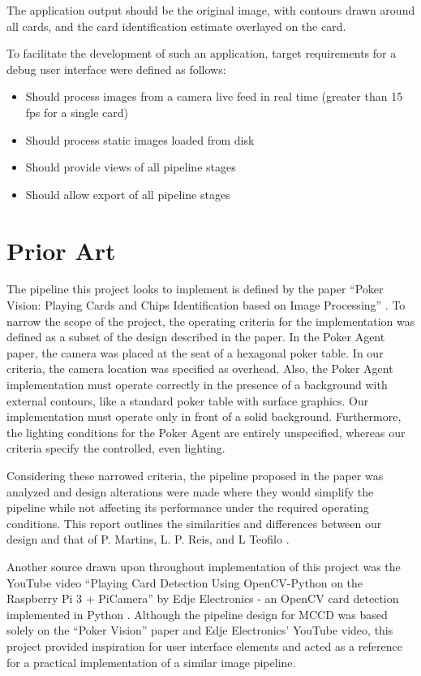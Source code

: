 \documentclass[conference]{IEEEtran}
\begin{document}
The application output should be the original image, with contours drawn around all cards, and the
card identification estimate overlayed on the card.

To facilitate the development of such an application, target requirements for a debug user interface
were defined as follows:
\begin{itemize}
    \item Should process images from a camera live feed in real time (greater than 15 fps for a
        single card)
    \item Should process static images loaded from disk
    \item Should provide views of all pipeline stages
    \item Should allow export of all pipeline stages
\end{itemize}

\section{Prior Art}
The pipeline this project looks to implement is defined by the paper ``Poker Vision: Playing Cards
and Chips Identification based on Image Processing'' \cite{poker-vision}. To narrow the scope of the
project, the operating criteria for the implementation was defined as a subset of the design
described in the paper. In the Poker Agent paper, the camera was placed at the seat of a hexagonal
poker table. In our criteria, the camera location was specified as overhead. Also, the Poker Agent
implementation must operate correctly in the presence of a background with external contours, like a
standard poker table with surface graphics. Our implementation must operate only in front of a solid
background. Furthermore, the lighting conditions for the Poker Agent are entirely unspecified,
whereas our criteria specify the controlled, even lighting.

Considering these narrowed criteria, the pipeline proposed in the paper was analyzed and design
alterations were made where they would simplify the pipeline while not affecting its performance
under the required operating conditions. This report outlines the similarities and differences
between our design and that of P. Martins, L. P. Reis, and L Teofilo \cite{poker-vision}.

Another source drawn upon throughout implementation of this project was the YouTube video ``Playing
Card Detection Using OpenCV-Python on the Raspberry Pi 3 + PiCamera'' by Edje Electronics - an
OpenCV card detection implemented in Python \cite{opencv-card-detection}. Although the pipeline
design for MCCD was based solely on the ``Poker Vision'' paper and Edje Electronics' YouTube video,
this project provided inspiration for user interface elements and acted as a reference for a
practical implementation of a similar image pipeline.
\end{document}
